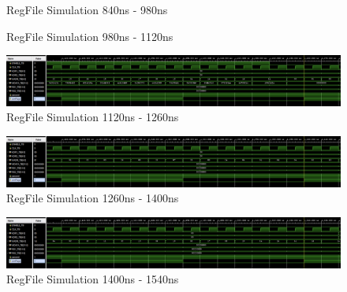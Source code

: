 \documentclass[
    a4paper, %
	12pt, %
    ]{CSSullivanBusinessReport}
\begin{document}
\begin{fullwidth}
\begin{figure}[H]
    \centering
    \captionsetup{style=widetable}
    \caption{RegFile Simulation 840ns - 980ns}
    \label{fig:regfilesim7}
\end{figure}

\begin{figure}[H]
    \centering
    \captionsetup{style=widetable}
    \caption{RegFile Simulation 980ns - 1120ns}
    \label{fig:regfilesim8}
\end{figure}

\begin{figure}[H]
    \centering
    \captionsetup{style=widetable}
    \includegraphics[width=.80\pdfpagewidth]{Figures/RegFile Simulation 08.png}
    \caption{RegFile Simulation 1120ns - 1260ns}
    \label{fig:regfilesim9}
\end{figure}

\begin{figure}[H]
    \centering
    \captionsetup{style=widetable}
    \includegraphics[width=.80\pdfpagewidth]{Figures/RegFile Simulation 09.png}
    \caption{RegFile Simulation 1260ns - 1400ns}
    \label{fig:regfilesim10}
\end{figure}

\begin{figure}[H]
    \centering
    \captionsetup{style=widetable}
    \includegraphics[width=.80\pdfpagewidth]{Figures/RegFile Simulation 10.png}
    \caption{RegFile Simulation 1400ns - 1540ns}
    \label{fig:regfilesim11}
\end{figure}


\end{fullwidth}
\end{document}
